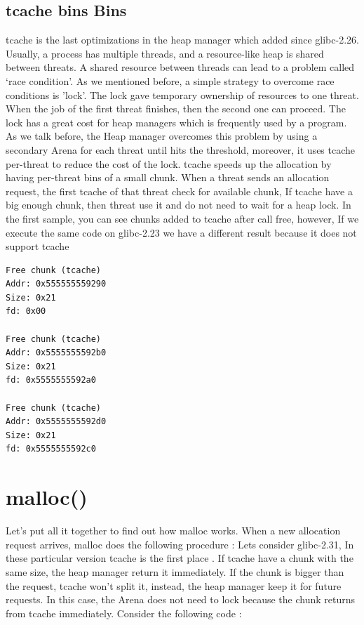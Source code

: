 \documentclass{masterthesis}
\newcommand*\libc{glibc}
\newcommand*\tch{tcache}
\begin{document}
\subsection{\tch{} bins Bins}
\tch{} is the last optimizations in the heap manager which added since \libc{-2.26}. Usually, a process has multiple threads, and a resource-like heap is shared between threats. A shared resource between threads can lead to a problem called ‘race condition’. As we mentioned before, a simple strategy to overcome race conditions is 'lock'. The lock gave temporary ownership of resources to one threat. When the job of the first threat finishes, then the second one can proceed. The lock has a great cost for heap managers which is frequently used by a program. As we talk before, the Heap manager overcomes this problem by using a secondary Arena for each threat until hits the threshold, moreover, it uses \tch{} per-threat to reduce the cost of the lock. \tch{} speeds up the allocation by having per-threat bins of a small chunk. When a threat sends an allocation request, the first \tch{} of that threat check for available chunk, If \tch{} have a big enough chunk, then threat use it and do not need to wait for a heap lock. In the first sample, you can see chunks added to \tch{} after call free, however, If we execute the same code on \libc{-2.23} we have a different result because it does not support \tch{}

\begin{lstlisting}[frame=tlrb]
Free chunk (tcache) 
Addr: 0x555555559290
Size: 0x21
fd: 0x00

Free chunk (tcache) 
Addr: 0x5555555592b0
Size: 0x21
fd: 0x5555555592a0

Free chunk (tcache) 
Addr: 0x5555555592d0
Size: 0x21
fd: 0x5555555592c0
\end{lstlisting}

\section{malloc()}
Let's put all it together to find out how malloc works. When a new allocation request arrives, malloc does the following procedure :
Lets consider \libc{-2.31}, In these particular version \tch{} is the first place . If \tch{} have a chunk with the same size, the heap manager return it immediately. If the chunk is bigger than the request, \tch{} won't split it, instead, the heap manager keep it for future requests. In this case, the Arena does not need to lock because the chunk returns from \tch{} immediately. Consider the following code :
\end{document}
